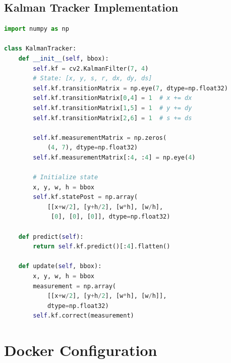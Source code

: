 \documentclass[12pt,a4paper]{report}
\begin{document}
\subsection{Kalman Tracker Implementation}

\begin{lstlisting}[language=Python, caption=Kalman Filter Tracker]
import numpy as np

class KalmanTracker:
    def __init__(self, bbox):
        self.kf = cv2.KalmanFilter(7, 4)
        # State: [x, y, s, r, dx, dy, ds]
        self.kf.transitionMatrix = np.eye(7, dtype=np.float32)
        self.kf.transitionMatrix[0,4] = 1  # x += dx
        self.kf.transitionMatrix[1,5] = 1  # y += dy
        self.kf.transitionMatrix[2,6] = 1  # s += ds

        self.kf.measurementMatrix = np.zeros(
            (4, 7), dtype=np.float32)
        self.kf.measurementMatrix[:4, :4] = np.eye(4)

        # Initialize state
        x, y, w, h = bbox
        self.kf.statePost = np.array(
            [[x+w/2], [y+h/2], [w*h], [w/h],
             [0], [0], [0]], dtype=np.float32)

    def predict(self):
        return self.kf.predict()[:4].flatten()

    def update(self, bbox):
        x, y, w, h = bbox
        measurement = np.array(
            [[x+w/2], [y+h/2], [w*h], [w/h]],
            dtype=np.float32)
        self.kf.correct(measurement)
\end{lstlisting}

\section{Docker Configuration}
\end{document}

